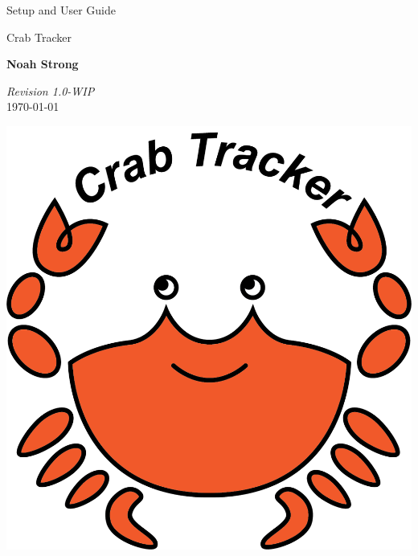 \documentclass[12pt]{article}
\begin{document}
\begin{titlepage}

\vspace*{5cm}

\begin{huge}
Setup and User Guide
\end{huge}

\begin{large}
Crab Tracker

\vspace*{1cm}

\textbf{Noah Strong}

\vspace*{1cm}
\end{large}

\textit{Revision 1.0-WIP}\\
\today

\vfill
\hfill \includegraphics[scale=1]{ct-logo.png}

\end{titlepage}
\tableofcontents{}

\newpage

\end{document}
